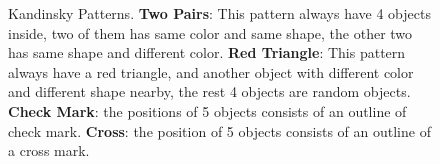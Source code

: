 \documentclass[
]{ceurart}
\begin{document}
	\begin{figure}[t]%
		\centering
		\caption{Kandinsky Patterns. \textbf{Two Pairs}: This pattern always have 4 objects inside, two of them has same color and same shape, the other two has same shape and different color. \textbf{Red Triangle}: This pattern always have a red triangle, and another object with different color and different shape nearby, the rest 4 objects are random objects. \textbf{Check Mark}: the positions of 5 objects consists of an outline of check mark. \textbf{Cross}: the position of 5 objects consists of an outline of a cross mark.}
		\label{fig:kandinsky-patterns}
	\end{figure}
	
\end{document}
